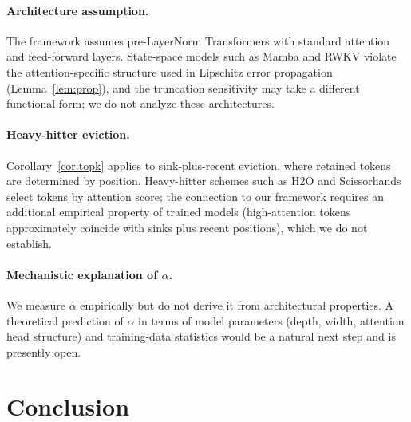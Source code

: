 \documentclass[11pt]{article}
\theoremstyle{plain}
\theoremstyle{definition}
\theoremstyle{remark}
\begin{document}
\paragraph{Architecture assumption.}
The framework assumes pre-LayerNorm Transformers with standard
attention and feed-forward layers. State-space models such as
Mamba and RWKV violate the attention-specific structure used in
Lipschitz error propagation (Lemma~\ref{lem:prop}), and the
truncation sensitivity may take a different functional form; we do
not analyze these architectures.

\paragraph{Heavy-hitter eviction.}
Corollary~\ref{cor:topk} applies to sink-plus-recent eviction,
where retained tokens are determined by position. Heavy-hitter
schemes such as H2O \citep{zhang2023h2o} and Scissorhands
\citep{liu2023scissorhands} select tokens by attention score; the
connection to our framework requires an additional empirical
property of trained models (high-attention tokens approximately
coincide with sinks plus recent positions), which we do not
establish.

\paragraph{Mechanistic explanation of $\alpha$.}
We measure $\alpha$ empirically but do not derive it from
architectural properties. A theoretical prediction of $\alpha$ in
terms of model parameters (depth, width, attention head structure)
and training-data statistics would be a natural next step and is
presently open.

\section{Conclusion}
\label{sec:conclusion}
\end{document}
